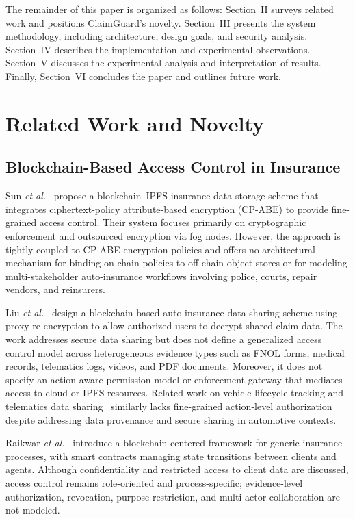 \documentclass[final,5p,times,twocolumn]{elsarticle}
\begin{document}
The remainder of this paper is organized as follows: Section~II surveys related work and positions ClaimGuard's novelty. Section~III presents the system methodology, including architecture, design goals, and security analysis. Section~IV describes the implementation and experimental observations. Section~V discusses the experimental analysis and interpretation of results. Finally, Section~VI concludes the paper and outlines future work.

\section{Related Work and Novelty}

\subsection{Blockchain-Based Access Control in Insurance}
Sun \emph{et al.}~\cite{sun2020insurance} propose a blockchain--IPFS insurance data storage scheme that integrates ciphertext-policy attribute-based encryption (CP-ABE) to provide fine-grained access control. Their system focuses primarily on cryptographic enforcement and outsourced encryption via fog nodes. However, the approach is tightly coupled to CP-ABE encryption policies and offers no architectural mechanism for binding on-chain policies to off-chain object stores or for modeling multi-stakeholder auto-insurance workflows involving police, courts, repair vendors, and reinsurers.

Liu \emph{et al.}~\cite{liu2021auto} design a blockchain-based auto-insurance data sharing scheme using proxy re-encryption to allow authorized users to decrypt shared claim data. The work addresses secure data sharing but does not define a generalized access control model across heterogeneous evidence types such as FNOL forms, medical records, telematics logs, videos, and PDF documents. Moreover, it does not specify an action-aware permission model or enforcement gateway that mediates access to cloud or IPFS resources. Related work on vehicle lifecycle tracking and telematics data sharing~\cite{syed2020vehicle, brousmiche2018digitizing, brousmiche2018hybrid, singh2019ubi, singh2020vcare} similarly lacks fine-grained action-level authorization despite addressing data provenance and secure sharing in automotive contexts.

Raikwar \emph{et al.}~\cite{raikwar2018insurance} introduce a blockchain-centered framework for generic insurance processes, with smart contracts managing state transitions between clients and agents. Although confidentiality and restricted access to client data are discussed, access control remains role-oriented and process-specific; evidence-level authorization, revocation, purpose restriction, and multi-actor collaboration are not modeled.
\end{document}
